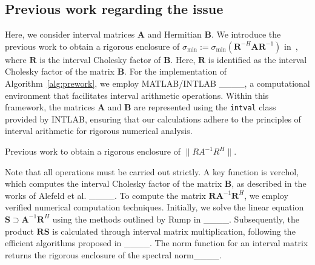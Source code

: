 \subsection{Previous work regarding the issue}

Here, we consider interval matrices $\bm{A}$ and Hermitian $\bm{B}$.
We introduce the previous work to obtain a rigorous enclosure of $\sigma_{\min}:=\sigma_{\min}(\bm{R}^{-H}\bm{A}\bm{R}^{-1})$ in~\cite[p. 440]{nakao2019numerical}, where $\bm{R}$ is the interval Cholesky factor of $\bm{B}$.
Here, $\bm{R}$ is identified as the interval Cholesky factor of the matrix $\bm{B}$. For the implementation of Algorithm~\ref{alg:prework}, we employ MATLAB/INTLAB ____, a computational environment that facilitates interval arithmetic operations. Within this framework, the matrices $\bm{A}$ and $\bm{B}$ are represented using the {\tt intval} class provided by INTLAB, ensuring that our calculations adhere to the principles of interval arithmetic for rigorous numerical analysis.

\begin{algorithm}
\caption{Previous work  to obtain a rigorous enclosure of $\|RA^{-1}R^{H}\|$.}\label{alg:prework}
\begin{algorithmic}
\end{algorithmic}
\end{algorithm}

Note that all operations must be carried out strictly.
A key function is $\mathrm{verchol}$, which computes the interval Cholesky factor of the matrix $\bm{B}$, as described in the works of Alefeld et al. ____.
To compute the matrix $\bm{R}\bm A^{-1}\bm{R}^{H}$, we employ verified numerical computation techniques. 
Initially, we solve the linear equation $\bm{S}\supset \bm A^{-1}\bm{R}^{H}$ using the methods outlined by Rump in ____. Subsequently, the product $\bm{R}\bm{S}$ is calculated through interval matrix multiplication, following the efficient algorithms proposed in ____.
The $\mathrm{norm}$ function for an interval matrix returns the rigorous enclosure of the spectral norm____.